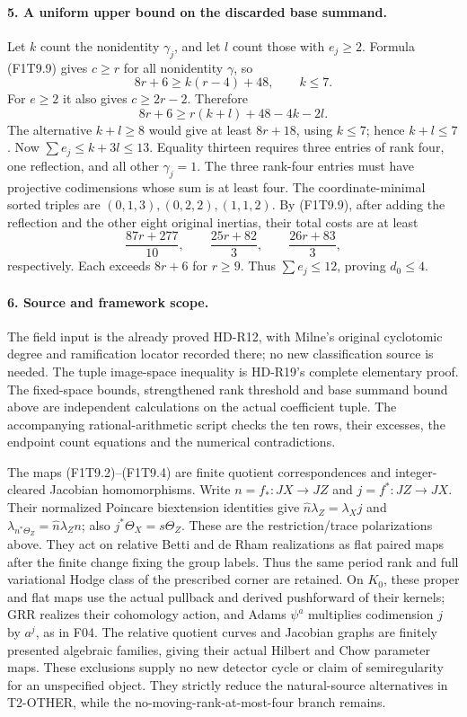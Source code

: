 \paragraph{5. A uniform upper bound on the discarded base summand.}
Let \(k\) count the nonidentity \(\gamma_j\), and let \(l\)
count those with \(e_j\ge2\). Formula (F1T9.9) gives \(c\ge r\)
for all nonidentity \(\gamma\), so
\[
             8r+6\ge k(r-4)+48,\qquad k\le7.
\]
For \(e\ge2\) it also gives \(c\ge2r-2\). Therefore
\[
             8r+6\ge r(k+l)+48-4k-2l.
\]
The alternative \(k+l\ge8\) would give at least \(8r+18\),
using \(k\le7\); hence \(k+l\le7\).
Now \(\sum e_j\le k+3l\le13\). Equality thirteen requires
three entries of rank four, one reflection, and all other
\(\gamma_j=1\). The three rank-four entries must have
projective codimensions whose sum is at least four.
The coordinate-minimal sorted triples are
\((0,1,3),(0,2,2),(1,1,2)\).
By (F1T9.9), after adding the reflection and the other
eight original inertias, their total costs are at least
\[
 \frac{87r+277}{10},\qquad
 \frac{25r+82}{3},\qquad
 \frac{26r+83}{3},
\]
respectively. Each exceeds \(8r+6\) for \(r\ge9\).
Thus \(\sum e_j\le12\), proving \(d_0\le4\).

\paragraph{6. Source and framework scope.}
The field input is the already proved HD-R12, with Milne's
original cyclotomic degree and ramification locator recorded
there; no new classification source is needed. The tuple
image-space inequality is HD-R19's complete elementary proof.
The fixed-space bounds, strengthened rank threshold and base
summand bound above are independent calculations on the actual
coefficient tuple. The accompanying rational-arithmetic script
checks the ten rows, their excesses, the endpoint count
equations and the numerical contradictions.

The maps (F1T9.2)--(F1T9.4) are finite quotient correspondences
and integer-cleared Jacobian homomorphisms. Write
\(n=f_*:JX\to JZ\) and \(j=f^*:JZ\to JX\).
Their normalized Poincare biextension identities give
\(\widehat n\lambda_Z=\lambda_Xj\) and
\(\lambda_{n^*\Theta_Z}=\widehat n\lambda_Zn\);
also \(j^*\Theta_X=s\Theta_Z\).
These are the restriction/trace polarizations above. They act on relative
Betti and de Rham realizations as flat paired maps after the
finite change fixing the group labels. Thus the same period
rank and full variational Hodge class of the prescribed
corner are retained. On \(K_0\), these proper and flat maps
use the actual pullback and derived pushforward of their
kernels; GRR realizes their cohomology action, and Adams
\(\psi^a\) multiplies codimension \(j\) by \(a^j\), as in F04.
The relative quotient curves and Jacobian graphs are finitely
presented algebraic families, giving their actual Hilbert and
Chow parameter maps. These exclusions supply no new detector
cycle or claim of semiregularity for an unspecified object.
They strictly reduce the natural-source alternatives in
T2-OTHER, while the no-moving-rank-at-most-four branch remains.
